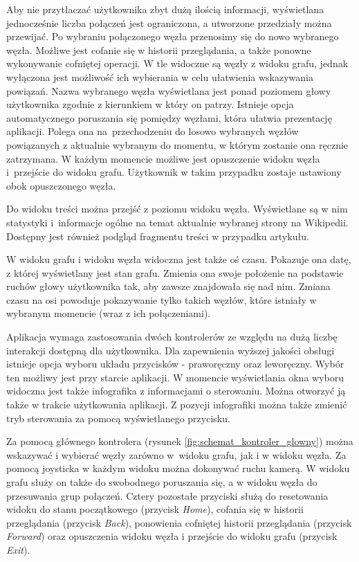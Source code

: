 Aby nie przytłaczać użytkownika zbyt dużą ilością informacji, wyświetlana jednocześnie liczba połączeń jest ograniczona, a utworzone przedziały można przewijać. Po wybraniu połączonego węzła przenosimy się do nowo wybranego węzła. Możliwe jest cofanie się w historii przeglądania, a także ponowne wykonywanie cofniętej operacji. W tle widoczne są węzły z widoku grafu, jednak wyłączona jest możliwość ich wybierania w celu ułatwienia wskazywania powiązań. Nazwa wybranego węzła wyświetlana jest ponad poziomem głowy użytkownika zgodnie z kierunkiem w który on patrzy. Istnieje opcja automatycznego poruszania się pomiędzy węzłami, która ułatwia prezentację aplikacji. Polega ona na~przechodzeniu do losowo wybranych węzłów powiązanych z aktualnie wybranym do momentu, w którym zostanie ona ręcznie zatrzymana. W każdym momencie możliwe jest opuszczenie widoku węzła i~przejście do widoku grafu. Użytkownik w takim przypadku zostaje ustawiony obok opuszczonego węzła. 

Do widoku treści można przejść z poziomu widoku węzła. Wyświetlane są w nim statystyki i~informacje ogólne na temat aktualnie wybranej strony na Wikipedii. Dostępny jest również podgląd fragmentu treści w przypadku artykułu.

W widoku grafu i widoku węzła widoczna jest także oś czasu. Pokazuje ona datę, z której wyświetlany jest stan grafu. Zmienia ona swoje położenie na podstawie ruchów głowy użytkownika tak, aby zawsze znajdowała się nad nim. Zmiana czasu na osi powoduje pokazywanie tylko takich węzłów, które istniały w wybranym momencie (wraz z ich połączeniami).

Aplikacja wymaga zastosowania dwóch kontrolerów ze względu na dużą liczbę interakcji dostępną dla użytkownika. Dla zapewnienia wyższej jakości obsługi istnieje opcja wyboru układu przycisków - praworęczny oraz leworęczny. Wybór ten możliwy jest przy starcie aplikacji. W momencie wyświetlania okna wyboru widoczna jest także infografika z informacjami o sterowaniu. Można otworzyć ją także w trakcie użytkowania aplikacji. Z pozycji infografiki można także zmienić tryb sterowania za pomocą wyświetlanego przycisku.

Za pomocą głównego kontrolera (rysunek \ref{fig:schemat_kontroler_glowny}) można wskazywać i wybierać węzły zarówno w~widoku grafu, jak i w widoku węzła. Za pomocą joysticka w każdym widoku można dokonywać ruchu kamerą. W widoku grafu służy on także do swobodnego poruszania się, a w widoku węzła do przesuwania grup połączeń. Cztery pozostałe przyciski służą do resetowania widoku do stanu początkowego (przycisk \textit{Home}), cofania się w historii przeglądania (przycisk \textit{Back}), ponowienia cofniętej historii przeglądania (przycisk \textit{Forward}) oraz opuszczenia widoku węzła i przejście do widoku grafu (przycisk \textit{Exit}).

